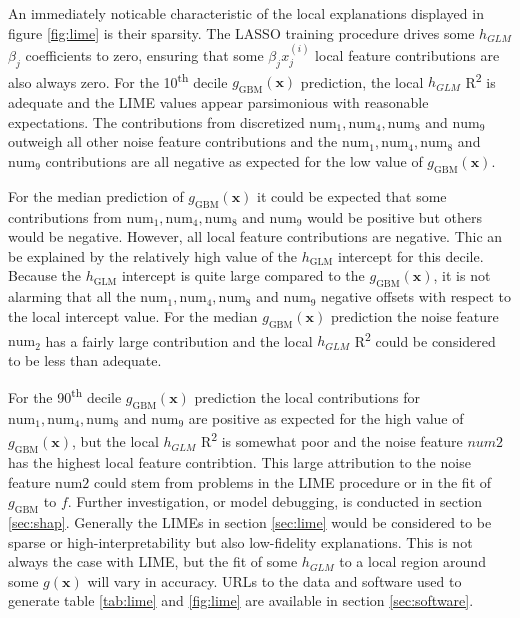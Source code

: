 \documentclass{article}
\begin{document}
An immediately noticable characteristic of the local explanations displayed in figure \ref{fig:lime} is their sparsity. The LASSO training procedure drives some $h_{GLM}$ $\beta_j$ coefficients to zero, ensuring that some $\beta_j x_j^{(i)}$ local feature contributions are also always zero. For the 10\textsuperscript{th} decile $g_{\text{GBM}}(\mathbf{x})$ prediction, the local $h_{GLM}$ R\textsuperscript{2} is adequate and the LIME values appear parsimonious with reasonable expectations. The contributions from discretized $\text{num}_1, \text{num}_4, \text{num}_8$ and $\text{num}_9$ outweigh all other noise feature contributions and the $\text{num}_1, \text{num}_4, \text{num}_8$ and $\text{num}_9$ contributions are all negative as expected for the low value of $g_{\text{GBM}}(\mathbf{x})$. 

For the median prediction of $g_{\text{GBM}}(\mathbf{x})$ it could be expected that some contributions from $\text{num}_1, \text{num}_4, \text{num}_8$ and $\text{num}_9$ would be positive but others would be negative. However, all local feature contributions are negative. Thic an be explained by the relatively high value of the $h_{\text{GLM}}$ intercept for this decile. Because the $h_{\text{GLM}}$ intercept is quite large compared to the $g_{\text{GBM}}(\mathbf{x})$, it is not alarming that all the $\text{num}_1, \text{num}_4, \text{num}_8$ and $\text{num}_9$ negative offsets with respect to the local intercept value. For the median $g_{\text{GBM}}(\mathbf{x})$ prediction the noise feature $\text{num}_2$ has a fairly large contribution and the local $h_{GLM}$ R\textsuperscript{2} could be considered to be less than adequate.

For the 90\textsuperscript{th} decile $g_{\text{GBM}}(\mathbf{x})$ prediction the local contributions for $\text{num}_1, \text{num}_4, \text{num}_8$ and $\text{num}_9$ are positive as expected for the high value of $g_{\text{GBM}}(\mathbf{x})$, but the local $h_{GLM}$ R\textsuperscript{2} is somewhat poor and the noise feature $num2$ has the highest local feature contribtion. This large attribution to the noise feature $\text{num}2$ could stem from problems in the LIME procedure or in the fit of $g_{\text{GBM}}$ to $f$. Further investigation, or model debugging, is conducted in section \ref{sec:shap}. Generally the LIMEs in section \ref{sec:lime} would be considered to be sparse or high-interpretability but also low-fidelity explanations. This is not always the case with LIME, but the fit of some $h_{GLM}$ to a local region around some $g(\mathbf{x})$ will vary in accuracy. URLs to the data and software used to generate table \ref{tab:lime} and \ref{fig:lime} are available in section \ref{sec:software}.
\end{document}
